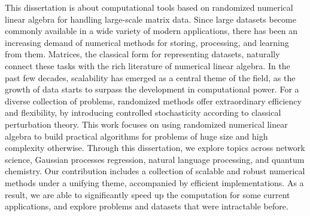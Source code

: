 This dissertation is about computational tools based on randomized numerical
linear algebra for handling large-scale matrix data. Since large datasets become
commonly available in a wide variety of modern applications, there has been an
increasing demand of numerical methods for storing, processing, and learning
from them. Matrices, the classical form for representing datasets, naturally
connect these tasks with the rich literature of numerical linear algebra. In the
past few decades, scalability has emerged as a central theme of the field, as
the growth of data starts to surpass the development in computational power. For
a diverse collection of problems, randomized methods offer extraordinary
efficiency and flexibility, by introducing controlled stochasticity according to
classical perturbation theory. This work focuses on using randomized
numerical linear algebra to build practical algorithms for problems of huge size
and high complexity otherwise. Through this dissertation, we explore topics
across network science, Gaussian processes regression, natural language
processing, and quantum chemistry. Our contribution includes a collection of
scalable and robust numerical methods under a unifying theme, accompanied by
efficient implementations. As a result, we are able to significantly speed up
the computation for some current applications, and explore problems and datasets
that were intractable before.